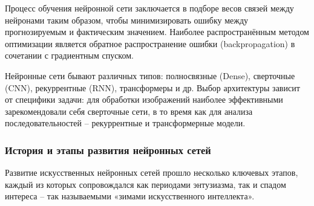 Процесс обучения нейронной сети заключается в подборе весов связей между нейронами таким образом, чтобы минимизировать ошибку между прогнозируемым и фактическим значением. Наиболее распространённым методом оптимизации является обратное распространение ошибки (backpropagation) в сочетании с градиентным спуском.


Нейронные сети бывают различных типов: полносвязные (Dense), сверточные (CNN), рекуррентные (RNN), трансформеры и др. Выбор архитектуры зависит от специфики задачи: для обработки изображений наиболее эффективными зарекомендовали себя сверточные сети, в то время как для анализа последовательностей – рекуррентные и трансформерные модели.

\subsubsection{История и этапы развития нейронных сетей}

Развитие искусственных нейронных сетей прошло несколько ключевых этапов, каждый из которых сопровождался как периодами энтузиазма, так и спадом интереса – так называемыми «зимами искусственного интеллекта».

